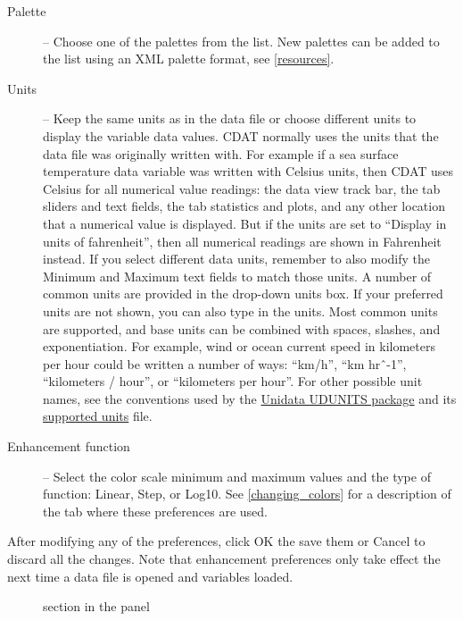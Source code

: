 \begin{description}

\item[Palette] -- Choose one of the palettes from the list.  New
palettes can be added to the list using an XML palette format,
see \autoref{resources}.

\item[Units] -- Keep the same units as in the data file or choose
different units to display the variable data values.  CDAT
normally uses the units that the data file was originally written
with.  For example if a sea surface temperature data variable was
written with Celsius units, then CDAT uses Celsius for all
numerical value readings: the data view track bar, the
 tab sliders and text
fields, the  tab statistics
and plots, and any other location that a numerical value is
displayed.  But if the units are set to ``Display in units of
fahrenheit'', then all numerical readings are shown in Fahrenheit
instead.  If you select different data units, remember to also
modify the {\gui Minimum} and {\gui Maximum} text fields to match
those units.  A number of common units are provided in the
drop-down units box. If your preferred units are not shown, you
can also type in the units. Most common units are supported, and
base units can be combined with spaces, slashes, and
exponentiation. For example, wind or ocean current speed in
kilometers per hour could be written a number of ways: ``km/h'',
``km hr\^{~}-1'', ``kilometers / hour'', or ``kilometers per
hour''.  For other possible unit names, see the
conventions used by the \href{https://www.google.com/search?q=udunits}{Unidata
UDUNITS package} and its \href{https://www.google.com/search?q=udunits.txt}{supported
units} file.

\item[Enhancement function] -- Select the color scale minimum and
maximum values and the type of function: {\gui Linear},
{\gui Step}, or {\gui Log10}. See \autoref{changing_colors} for a
description of the  tab
where these preferences are used.

\end{description}
After modifying any of the preferences, click {\gui OK} the save
them or {\gui Cancel} to discard all the changes.  Note that
enhancement preferences only take effect the next time a data
file is opened and variables loaded.

\begin{figure}
  \begin{center}
    \caption[Enhancement section in the Preferences panel]{
        section in the
        panel
    }
    \label{enhancement_prefs}
  \end{center}
\end{figure}

